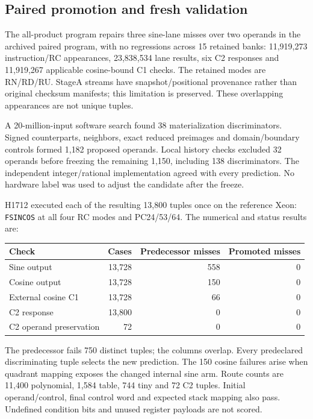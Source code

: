 \documentclass[11pt]{article}
\newcommand{\instr}[1]{\texttt{#1}}
\begin{document}
\subsection{Paired promotion and fresh validation}
\label{sec:paired-validation}

The all-product program repairs three sine-lane misses over two operands in
the archived paired program, with no
regressions across 15 retained banks: 11{,}919{,}273 instruction/RC appearances,
23{,}838{,}534 lane results, six C2 responses and 11{,}919{,}267 applicable
cosine-bound C1 checks. The retained modes are RN/RD/RU. StageA streams have
snapshot/positional provenance rather than original checksum manifests; this
limitation is preserved. These overlapping appearances are not unique tuples.

A 20-million-input software search found 38 materialization discriminators.
Signed counterparts, neighbors, exact reduced preimages and domain/boundary
controls formed 1{,}182 proposed operands. Local history checks excluded 32
operands before freezing the remaining 1{,}150, including 138 discriminators.
The independent integer/rational implementation agreed with every prediction.
No hardware label was used to adjust the candidate after the freeze.

H1712 executed each of the resulting 13{,}800 tuples once on the reference
Xeon: \instr{FSINCOS} at all four RC modes and PC24/53/64. The numerical and
status results are:
\begin{center}
\small
\begin{tabular}{lrrr}
\toprule
Check & Cases & Predecessor misses & Promoted misses\\
\midrule
Sine output & 13{,}728 & 558 & 0\\
Cosine output & 13{,}728 & 150 & 0\\
External cosine C1 & 13{,}728 & 66 & 0\\
C2 response & 13{,}800 & 0 & 0\\
C2 operand preservation & 72 & 0 & 0\\
\bottomrule
\end{tabular}
\end{center}
The predecessor fails 750 distinct tuples; the columns overlap. Every
predeclared discriminating tuple selects the new prediction. The 150 cosine
failures arise when quadrant mapping exposes the changed internal sine arm.
Route counts are 11{,}400 polynomial, 1{,}584 table, 744 tiny and 72 C2 tuples.
Initial operand/control, final control word and expected stack mapping also
pass. Undefined condition bits and unused register payloads are not scored.
\end{document}
